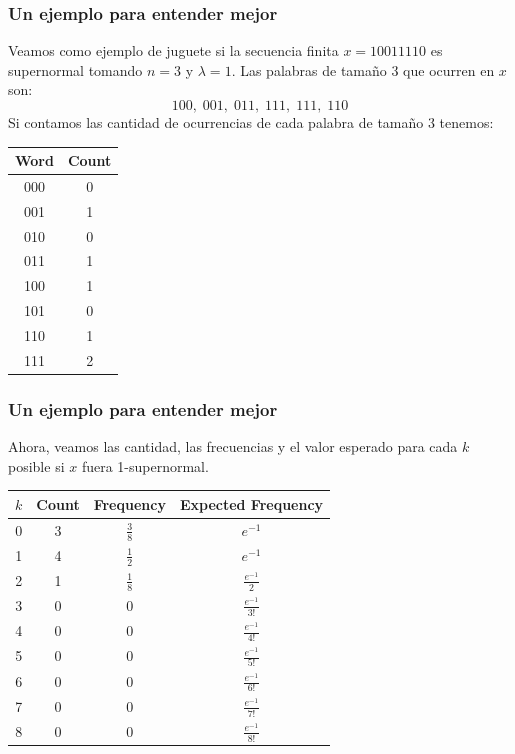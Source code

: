 \documentclass[10pt,mathserif]{beamer}%
\begin{document}
\begin{frame}
  \frametitle{Un ejemplo para entender mejor}
  Veamos como ejemplo de juguete si la secuencia finita $x = 10011110$ es supernormal tomando $n=3$ y $\lambda = 1$.
  \pause
  Las palabras de tamaño 3 que ocurren en $x$ son:
  $$100, \; 001, \; 011,\; 111,\; 111,\; 110$$
  \pause
  Si contamos las cantidad de ocurrencias de cada palabra de tamaño 3 tenemos: 
  \begin{center}
    \begin{tabular}{|c | c|} 
    \hline
    Word & Count \\ [0.5ex] 
    \hline
    000 & 0 \\ 
    \hline
    001 & 1 \\ 
    \hline
    010 & 0 \\ 
    \hline
    011 & 1 \\ 
    \hline
    100 & 1 \\ 
    \hline
    101 & 0 \\ 
    \hline
    110 & 1 \\ 
    \hline
    111 & 2 \\ 
    \hline
   \end{tabular}
\end{center}
\end{frame}

\begin{frame}
  \frametitle{Un ejemplo para entender mejor}
  Ahora, veamos las cantidad, las frecuencias y el valor esperado para cada $k$ posible si $x$ fuera 1-supernormal.
  \pause
  \begin{center}
    \begin{tabular}{|c | c |  c| c |} 
    \hline
    $k$ & Count &  Frequency & Expected Frequency \\ [0.1ex] 
    \hline
    0 & 3 & $\frac{3}{8}$ & $e^{-1} $ \\ [0.5ex] 
    \hline
    1 & 4 &$\frac{1}{2}$ & $e^{-1} $ \\  [0.5ex] 
    \hline
    2 & 1 &$\frac{1}{8}$ & $\frac{e^{-1}}{2} $ \\  [0.5ex] 
    \hline
    3 & 0 & 0 & $\frac{e^{-1}}{3!} $ \\  [0.5ex] 
    \hline
    4 & 0 & 0 & $\frac{e^{-1}}{4!} $ \\ [0.5ex] 
    \hline
    5 & 0 & 0 & $\frac{e^{-1}}{5!} $ \\ [0.5ex] 
    \hline
    6 & 0 & 0  & $\frac{e^{-1}}{6!} $ \\ [0.5ex] 
    \hline
    7 & 0 & 0 & $\frac{e^{-1}}{7!} $ \\ [0.5ex] 
    \hline
    8 & 0 & 0 & $\frac{e^{-1}}{8!} $ \\  [0.5ex] 
    \hline
   \end{tabular}
\end{center}
\end{frame}
\end{document}
